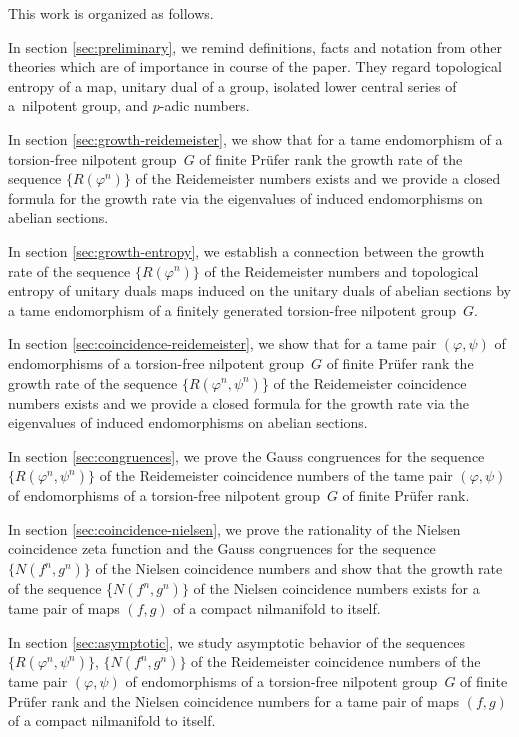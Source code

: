 \documentclass[12pt, a4paper]{amsart}
\begin{document}
This work is organized as follows.

In section \ref{sec:preliminary}, we remind definitions, facts and notation from other theories
 which are of  importance in course of the paper.
They regard topological entropy of a map, unitary dual of a group,
isolated lower central series of a~nilpotent group, and $p$-adic numbers.

In section \ref{sec:growth-reidemeister}, we show that for a tame endomorphism of a
torsion-free nilpotent group~$G$ of finite Pr\"ufer rank the growth rate
of the sequence $\{R(\varphi^n)\}$ of the Reidemeister numbers
exists and we provide a closed formula
for the growth rate via the eigenvalues of induced endomorphisms on abelian sections.

In section \ref{sec:growth-entropy}, we establish a connection between the growth rate
of the sequence $\{R(\varphi^n)\}$ of the Reidemeister numbers and topological entropy
of unitary duals maps induced on the unitary duals of abelian sections by a tame endomorphism
of a finitely generated torsion-free nilpotent group~$G$.

In section \ref{sec:coincidence-reidemeister},  we show that for a tame pair
$(\varphi,\psi)$  of endomorphisms of a
torsion-free nilpotent group~$G$ of finite Pr\"ufer rank the growth rate of the sequence
$\{R(\varphi^n,\psi^n)$\} of the Reidemeister coincidence numbers exists
and we provide a closed formula for the growth rate via the eigenvalues
of induced endomorphisms on abelian sections.

In section \ref{sec:congruences}, we prove the Gauss congruences for the sequence
$\{R(\varphi^n,\psi^n)\}$ of the
Reidemeister coincidence numbers of the tame pair $(\varphi,\psi)$ of endomorphisms of a
torsion-free nilpotent group~$G$ of finite Pr\"ufer rank.

In section \ref{sec:coincidence-nielsen}, we prove the rationality of the Nielsen coincidence zeta function
and
the Gauss congruences for the sequence $\{N(f^n, g^n)\}$ of the Nielsen coincidence numbers
and show that the growth rate of the sequence \{$N(f^n, g^n)\}$ of the
Nielsen coincidence numbers exists for a tame pair of maps  $(f,g)$
of a compact nilmanifold to itself.

In section \ref{sec:asymptotic}, we study asymptotic behavior of the sequences
$\{R(\varphi^n,\psi^n)\}$,  $\{N(f^n, g^n)\}$
of the Reidemeister coincidence numbers  of the tame pair $(\varphi,\psi)$ of endomorphisms of a
torsion-free nilpotent group~$G$ of finite Pr\"ufer rank and the Nielsen coincidence  numbers
 for a tame pair of maps  $(f,g)$
of a compact nilmanifold to itself.
\end{document}
